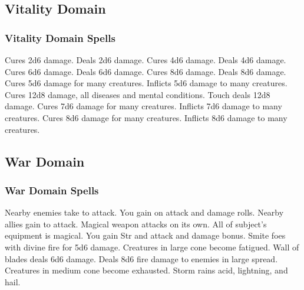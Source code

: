 \subsection{Vitality Domain}
\subsubsection{Vitality Domain Spells}
\begin{spelllist}
   Cures 2d6 damage.
   Deals 2d6 damage.
   Cures 4d6 damage.
   Deals 4d6 damage.
   Cures 6d6 damage.
   Deals 6d6 damage.
   Cures 8d6 damage.
   Deals 8d6 damage.
   Cures 5d6 damage for many creatures.
   Inflicts 5d6 damage to many creatures.
   Cures 12d8 damage, all diseases and mental conditions.
   Touch deals 12d8 damage.
   Cures 7d6 damage for many creatures.
   Inflicts 7d6 damage to many creatures.
   Cures 8d6 damage for many creatures.
   Inflicts 8d6 damage to many creatures.
  \spellhead[9]{}
  \spellhead[9]{}
\end{spelllist}

\subsection{War Domain}
\subsubsection{War Domain Spells}
\begin{spelllist}
   Nearby enemies take  to attack.
   You gain  on attack and damage rolls.
   Nearby allies gain  to attack.
   Magical weapon attacks on its own.
  \spellhead[3]{}
  \spellhead[3]{}
   All of subject's equipment is magical.
   You gain  Str and attack and damage bonus.
   Smite foes with divine fire for 5d6 damage.
   Creatures in large cone become fatigued.
   Wall of blades deals 6d6 damage.
  \spellhead[6]{}
  \spellhead[7]{}
  \spellhead[7]{}
   Deals 8d6 fire damage to enemies in large spread.
   Creatures in medium cone become exhausted.  
  \spellhead[9]{}
   Storm rains acid, lightning, and hail.
\end{spelllist}

